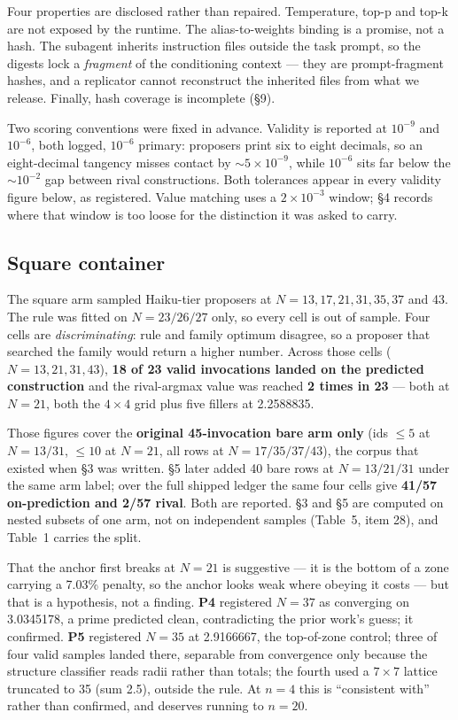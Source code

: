 \documentclass[11pt]{article}
\begin{document}
Four properties are disclosed rather than repaired. Temperature, top-p and top-k are not exposed
by the runtime. The alias-to-weights binding is a promise, not a hash. The subagent inherits
instruction files outside the task prompt, so the digests lock a \textit{fragment} of the conditioning
context --- they are prompt-fragment hashes, and a replicator cannot reconstruct the inherited
files from what we release. Finally, hash coverage is incomplete (\S9).

Two scoring conventions were fixed in advance. Validity is reported at $10^{-9}$ and $10^{-6}$, both
logged, $10^{-6}$ primary: proposers print six to eight decimals, so an eight-decimal tangency misses
contact by ${\sim}5\times10^{-9}$, while $10^{-6}$ sits far below the ${\sim}10^{-2}$ gap between rival constructions. Both
tolerances appear in every validity figure below, as registered. Value matching uses a $2\times10^{-3}$
window; \S4 records where that window is too loose for the distinction it was asked to carry.

\subsection{Square container}

The square arm sampled Haiku-tier proposers at $N = 13, 17, 21, 31, 35, 37$ and 43. The rule was
fitted on $N = 23/26/27$ only, so every cell is out of sample. Four cells are \textit{discriminating}:
rule and family optimum disagree, so a proposer that searched the family would return a higher
number. Across those cells ($N = 13, 21, 31, 43$), \textbf{18 of 23 valid invocations landed on the
predicted construction} and the rival-argmax value was reached \textbf{2 times in 23} --- both at
$N = 21$, both the $4\times4$ grid plus five fillers at 2.2588835.

Those figures cover the \textbf{original 45-invocation bare arm only} (ids $\le 5$ at $N = 13/31$, $\le 10$ at
$N = 21$, all rows at $N = 17/35/37/43$), the corpus that existed when \S3 was written. \S5 later
added 40 bare rows at $N = 13/21/31$ under the same arm label; over the full shipped ledger the
same four cells give \textbf{41/57 on-prediction and 2/57 rival}. Both are reported. \S3 and \S5 are
computed on nested subsets of one arm, not on independent samples (Table~5, item 28), and
Table~1 carries the split.

That the anchor first breaks at $N = 21$ is suggestive --- it is the bottom of a zone carrying a
7.03\% penalty, so the anchor looks weak where obeying it costs --- but that is a hypothesis, not
a finding. \textbf{P4} registered $N = 37$ as converging on 3.0345178, a prime predicted clean,
contradicting the prior work's guess; it confirmed. \textbf{P5} registered $N = 35$ at 2.9166667, the
top-of-zone control; three of four valid samples landed there, separable from convergence only
because the structure classifier reads radii rather than totals; the fourth used a $7\times7$
lattice truncated to 35 (sum 2.5), outside the rule. At $n = 4$ this is ``consistent with'' rather
than confirmed, and deserves running to $n = 20$.
\end{document}
